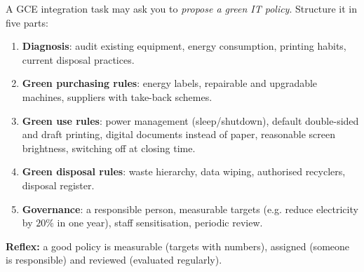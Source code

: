 \documentclass[11pt]{article}
\newcommand{\cle}[1]{{\popxbold\color{popdark}#1}}
\begin{document}
\begin{methode}
A GCE integration task may ask you to \emph{propose a green IT policy}. Structure it in five parts:
\begin{enumerate}
\item \textbf{Diagnosis}: audit existing equipment, energy consumption, printing habits, current disposal practices.
\item \textbf{Green purchasing rules}: energy labels, repairable and upgradable machines, suppliers with take-back schemes.
\item \textbf{Green use rules}: power management (sleep/shutdown), default double-sided and draft printing, digital documents instead of paper, reasonable screen brightness, switching off at closing time.
\item \textbf{Green disposal rules}: waste hierarchy, data wiping, authorised recyclers, disposal register.
\item \textbf{Governance}: a responsible person, measurable targets (e.g. reduce electricity by $20\%$ in one year), staff sensitisation, periodic review.
\end{enumerate}
\textbf{Reflex:} a good policy is \cle{measurable} (targets with numbers), \cle{assigned} (someone is responsible) and \cle{reviewed} (evaluated regularly).
\end{methode}
\end{document}
